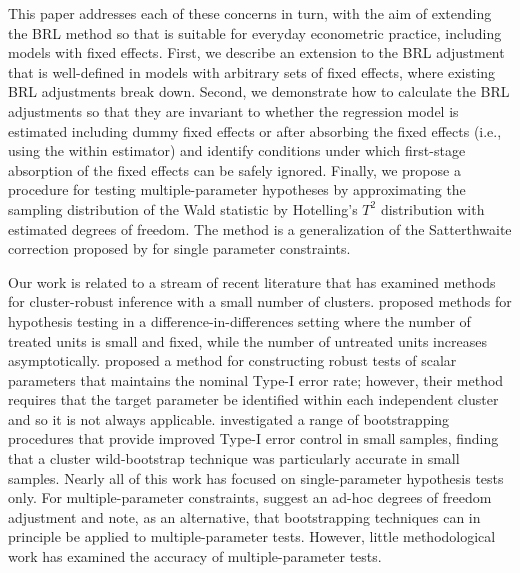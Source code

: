 \documentclass[12pt]{article}
\begin{document}
This paper addresses each of these concerns in turn, with the aim of extending the BRL method so that is suitable for everyday econometric practice, including models with fixed effects. 
First, we describe an extension to the BRL adjustment that is well-defined in models with arbitrary sets of fixed effects, where existing BRL adjustments break down. 
Second, we demonstrate how to calculate the BRL adjustments so that they are invariant to whether the regression model is estimated including dummy fixed effects or after absorbing the fixed effects (i.e., using the within estimator) and identify conditions under which first-stage absorption of the fixed effects can be safely ignored. 
Finally, we propose a procedure for testing multiple-parameter hypotheses by approximating the sampling distribution of the Wald statistic by Hotelling's $T^2$ distribution with estimated degrees of freedom. The method is a generalization of the Satterthwaite correction proposed by \citet{Bell2002bias} for single parameter constraints.

Our work is related to a stream of recent literature that has examined methods for cluster-robust inference with a small number of clusters. 
\citet{Conley2011inference} proposed methods for hypothesis testing in a difference-in-differences setting where the number of treated units is small and fixed, while the number of untreated units increases asymptotically. 
\citet{Ibragimov2010tstatistic} proposed a method for constructing robust tests of scalar parameters that maintains the nominal Type-I error rate; however, their method requires that the target parameter be identified within each independent cluster and so it is not always applicable.  
\citet{Cameron2008bootstrap} investigated a range of bootstrapping procedures that provide improved Type-I error control in small samples, finding that a cluster wild-bootstrap technique was particularly accurate in small samples. 
Nearly all of this work has focused on single-parameter hypothesis tests only. 
For multiple-parameter constraints, \citet{Cameron2015practitioners} suggest an ad-hoc degrees of freedom adjustment and note, as an alternative, that bootstrapping techniques can in principle be applied to multiple-parameter tests. 
However, little methodological work has examined the accuracy of multiple-parameter tests.
\end{document}
